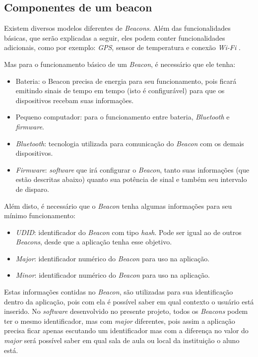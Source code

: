 \documentclass[
	12pt,
	oneside,
	a4paper,
	english,
	brazil,
]{abntex2}
\begin{document}
\subsection{Componentes de um beacon}

Existem diversos modelos diferentes de \emph{Beacons}. Além das funcionalidades básicas, que serão explicadas a seguir, eles podem conter funcionalidades adicionais, como por exemplo: \emph{GPS}, sensor de temperatura e conexão \emph{Wi-Fi} \cite{beacon-sensors-easy-kontakt}.

Mas para o funcionamento básico de um \emph{Beacon}, é necessário que ele tenha:

\begin{itemize}
    \item Bateria: o Beacon precisa de energia para seu funcionamento, pois ficará emitindo sinais de tempo em tempo (isto é configurável) para que os dispositivos recebam suas informações.
    \item Pequeno computador: para o funcionamento entre bateria, \emph{Bluetooth} e \emph{firmware}.
    \item \emph{Bluetooth}: tecnologia utilizada para comunicação do \emph{Beacon} com os demais dispositivos.
    \item \emph{Firmware}: \emph{software} que irá configurar o \emph{Beacon}, tanto suas informações (que estão descritas abaixo) quanto sua potência de sinal e também seu intervalo de disparo.
\end{itemize}

Além disto, é necessário que o \emph{Beacon} tenha algumas informações para seu mínimo funcionamento:

\begin{itemize}
    \item \emph{UDID}: identificador do \emph{Beacon} com tipo \emph{hash}. Pode ser igual ao de outros \emph{Beacons}, desde que a aplicação tenha esse objetivo.
    \item \emph{Major}: identificador numérico do \emph{Beacon} para uso na aplicação.
    \item \emph{Minor}: identificador numérico do \emph{Beacon} para uso na aplicação.
\end{itemize}

Estas informações contidas no \emph{Beacon}, são utilizadas para sua identificação dentro da aplicação, pois com ela é possível saber em qual contexto o usuário está inserido. No \emph{software} desenvolvido no presente projeto, todos os \emph{Beacons} podem ter o mesmo identificador, mas com \emph{major} diferentes, pois assim a aplicação precisa ficar apenas escutando um identificador mas com a diferença no valor do \emph{major} será possível saber em qual sala de aula ou local da instituição o aluno está.
\end{document}
